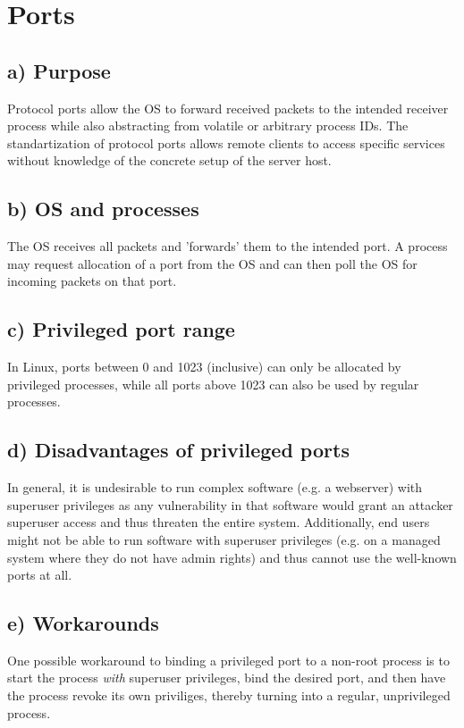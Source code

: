 \documentclass[a4paper, 11 pt, article, accentcolor=tud7b]{tudreport}
\begin{document}
	\section{Ports}
	
	\subsection*{a) Purpose}
	Protocol ports allow the OS to forward received packets to the intended receiver process while also abstracting from volatile or arbitrary process IDs. The standartization of protocol ports allows remote clients to access specific services without knowledge of the concrete setup of the server host.
	
	\subsection*{b) OS and processes}
	The OS receives all packets and 'forwards' them to the intended port. A process may request allocation of a port from the OS and can then poll the OS for incoming packets on that port.
	
	\subsection*{c) Privileged port range}
	In Linux, ports between 0 and 1023 (inclusive) can only be allocated by privileged processes, while all ports above 1023 can also be used by regular processes.
	
	\subsection*{d) Disadvantages of privileged ports}
	In general, it is undesirable to run complex software (e.g. a webserver) with superuser privileges as any vulnerability in that software would grant an attacker superuser access and thus threaten the entire system. Additionally, end users might not be able to run software with superuser privileges (e.g. on a managed system where they do not have admin rights) and thus cannot use the well-known ports at all.
	
	\subsection*{e) Workarounds}
	One possible workaround to binding a privileged port to a non-root process is to start the process \textit{with} superuser privileges, bind the desired port, and then have the process revoke its own priviliges, thereby turning into a regular, unprivileged process.
	
\end{document}
